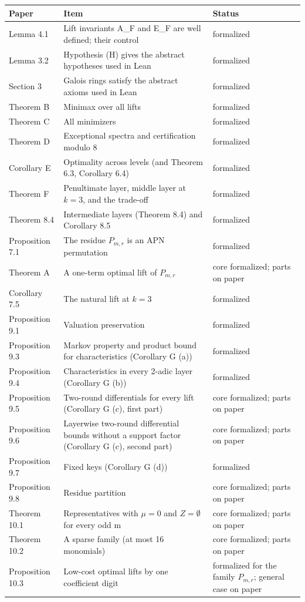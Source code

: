 \documentclass[11pt]{article}
\begin{document}
\begin{longtable}{p{}p{}p{}}\toprule Paper & Item & Status\\\midrule\endhead
Lemma 4.1 & Lift invariants A\_F and E\_F are well defined; their control & formalized\\
Lemma 3.2 & Hypothesis (H) gives the abstract hypotheses used in Lean & formalized\\
Section 3 & Galois rings satisfy the abstract axioms used in Lean & formalized\\
Theorem B & Minimax over all lifts & formalized\\
Theorem C & All minimizers & formalized\\
Theorem D & Exceptional spectra and certification modulo 8 & formalized\\
Corollary E & Optimality across levels (and Theorem 6.3, Corollary 6.4) & formalized\\
Theorem F & Penultimate layer, middle layer at $k=3$, and the trade-off & formalized\\
Theorem 8.4 & Intermediate layers (Theorem 8.4) and Corollary 8.5 & formalized\\
Proposition 7.1 & The residue $P_{m,r}$ is an APN permutation & formalized\\
Theorem A & A one-term optimal lift of $P_{m,r}$ & core formalized; parts on paper\\
Corollary 7.5 & The natural lift at $k=3$ & formalized\\
Proposition 9.1 & Valuation preservation & formalized\\
Proposition 9.3 & Markov property and product bound for characteristics (Corollary G (a)) & formalized\\
Proposition 9.4 & Characteristics in every 2-adic layer (Corollary G (b)) & formalized\\
Proposition 9.5 & Two-round differentials for every lift (Corollary G (c), first part) & core formalized; parts on paper\\
Proposition 9.6 & Layerwise two-round differential bounds without a support factor (Corollary G (c), second part) & core formalized; parts on paper\\
Proposition 9.7 & Fixed keys (Corollary G (d)) & formalized\\
Proposition 9.8 & Residue partition & core formalized; parts on paper\\
Theorem 10.1 & Representatives with $\mu=0$ and $Z=\emptyset$ for every odd m & core formalized; parts on paper\\
Theorem 10.2 & A sparse family (at most 16 monomials) & core formalized; parts on paper\\
Proposition 10.3 & Low-cost optimal lifts by one coefficient digit & formalized for the family $P_{m,r}$; general case on paper\\
\bottomrule\end{longtable}
\end{document}
